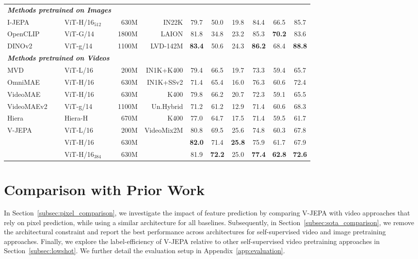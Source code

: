 \documentclass[twocolumn]{fairmeta}
\newcommand{\putalg}{{\small V-JEPA}\xspace}
\newcommand{\cc}{\cellcolor{metabg}}
\theoremstyle{plain}
\theoremstyle{definition}
\theoremstyle{remark}
\begin{document}
\begin{table}[t]
{\begin{tabular}{llrr ccc ccc}
        \midrule
        \multicolumn{2}{l}{\bf\it Methods pretrained on Images} & & & & & & \\[1ex]
        I-JEPA & ViT-H/16$_{512}$ & 630M & IN22K & 79.7 & 50.0 & 19.8 & 84.4 & 66.5 & 85.7 \\
        OpenCLIP & ViT-G/14 & 1800M & LAION & 81.8 & 34.8 & 23.2 & 85.3 & \bf 70.2 & 83.6 \\
        DINOv2 & ViT-g/14 & 1100M & LVD-142M & \bf 83.4 & 50.6 & 24.3 & \bf 86.2 & 68.4 & \bf 88.8 \\
        \midrule
        \multicolumn{2}{l}{\bf\it Methods pretrained on Videos} & & & & & & \\[1ex]
        MVD & ViT-L/16 & 200M & IN1K+K400 & 79.4 & 66.5 & 19.7 & 73.3 & 59.4 & 65.7 \\
        OmniMAE & ViT-H/16 & 630M & IN1K+SSv2 & 71.4 & 65.4 & 16.0 & 76.3 & 60.6 & 72.4\\
        VideoMAE & ViT-H/16 & 630M & K400 & 79.8 & 66.2 & 20.7 & 72.3 & 59.1 & 65.5 \\
        VideoMAEv2 & ViT-g/14 & 1100M & Un.Hybrid & 71.2 & 61.2 & 12.9 & 71.4 & 60.6 & 68.3\\
        Hiera & Hiera-H & 670M & K400 & 77.0 & 64.7 & 17.5 & 71.4 & 59.5 & 61.7 \\
        \midrule
        \multirow{3}{*}{V-JEPA} & ViT-L/16 & 200M & \multirow{3}{*}{VideoMix2M}
        & \cc 80.8 & \cc 69.5 & \cc 25.6 & \cc 74.8 & \cc 60.3 & \cc 67.8\\
        & ViT-H/16 & 630M & & \cc\bf 82.0 & \cc 71.4 & \cc\bf 25.8 & \cc 75.9 & \cc 61.7 & \cc 67.9 \\
        & ViT-H/16$_{384}$ & 630M & & \cc 81.9 & \cc\bf 72.2 & \cc 25.0 & \cc\bf 77.4 & \cc\bf 62.8 & \cc \bf 72.6 \\
        \bottomrule
    \end{tabular}}
\end{table}

\section{Comparison with Prior Work}
In Section~\ref{subsec:pixel_comparison}, we investigate the impact of feature prediction by comparing \putalg with video approaches that rely on pixel prediction, while using a similar architecture for all baselines.
Subsequently, in Section~\ref{subsec:sota_comparison}, we remove the architectural constraint and report the best performance across architectures for self-supervised video and image pretraining approaches. 
Finally, we explore the label-efficiency of \putalg relative to other self-supervised video pretraining approaches in Section~\ref{subsec:lowshot}.
We further detail the evaluation setup in Appendix~\ref{app:evaluation}.
\end{document}
